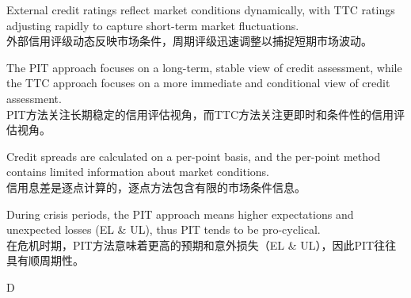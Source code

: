 \documentclass{article}
\begin{document}
\begin{choices}
    \item External credit ratings reflect market conditions dynamically, with TTC ratings adjusting rapidly to capture short-term market fluctuations.\\
    外部信用评级动态反映市场条件，周期评级迅速调整以捕捉短期市场波动。
    
    \item The PIT approach focuses on a long-term, stable view of credit assessment, while the TTC approach focuses on a more immediate and conditional view of credit assessment.\\
    PIT方法关注长期稳定的信用评估视角，而TTC方法关注更即时和条件性的信用评估视角。
    
    \item Credit spreads are calculated on a per-point basis, and the per-point method contains limited information about market conditions.\\
    信用息差是逐点计算的，逐点方法包含有限的市场条件信息。
    
    \item During crisis periods, the PIT approach means higher expectations and unexpected losses (EL \& UL), thus PIT tends to be pro-cyclical.\\
    在危机时期，PIT方法意味着更高的预期和意外损失（EL \& UL），因此PIT往往具有顺周期性。
\end{choices}
    
\begin{correctanswer}
    D
\end{correctanswer}
    
\end{document}
